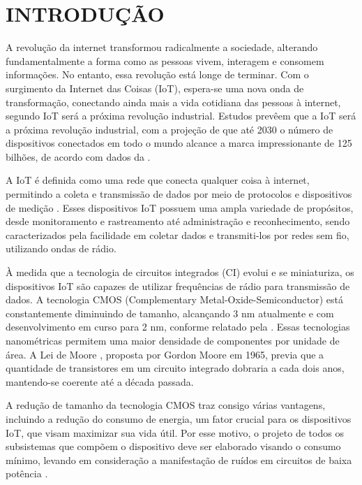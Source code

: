 \chapter{INTRODUÇÃO}\label{cap:introducao}

A revolução da internet transformou radicalmente a sociedade, alterando fundamentalmente a forma como as pessoas vivem, interagem e consomem informações. No entanto, essa revolução está longe de terminar. Com o surgimento da Internet das Coisas (IoT), espera-se uma nova onda de transformação, conectando ainda mais a vida cotidiana das pessoas à internet, segundo \cite{al2020internet} IoT será a próxima revolução industrial. Estudos prevêem que a IoT será a próxima revolução industrial, com a projeção de que até 2030 o número de dispositivos conectados em todo o mundo alcance a marca impressionante de 125 bilhões, de acordo com dados da \cite{cisco}.

A IoT é definida como uma rede que conecta qualquer coisa à internet, permitindo a coleta e transmissão de dados por meio de protocolos e dispositivos de medição \cite{patel2016internet}. Esses dispositivos IoT possuem uma ampla variedade de propósitos, desde monitoramento e rastreamento até administração e reconhecimento, sendo caracterizados pela facilidade em coletar dados e transmiti-los por redes sem fio, utilizando ondas de rádio.

À medida que a tecnologia de circuitos integrados (CI) evolui e se miniaturiza, os dispositivos IoT são capazes de utilizar frequências de rádio para transmissão de dados. A tecnologia CMOS (Complementary Metal-Oxide-Semiconductor) está constantemente diminuindo de tamanho, alcançando 3 nm atualmente e com desenvolvimento em curso para 2 nm, conforme relatado pela \cite{tsmc}. Essas tecnologias nanométricas permitem uma maior densidade de componentes por unidade de área. A Lei de Moore \cite{moore1965moore}, proposta por Gordon Moore em 1965, previa que a quantidade de transistores em um circuito integrado dobraria a cada dois anos, mantendo-se coerente até a década passada.

A redução de tamanho da tecnologia CMOS traz consigo várias vantagens, incluindo a redução do consumo de energia, um fator crucial para os dispositivos IoT, que visam maximizar sua vida útil. Por esse motivo, o projeto de todos os subsistemas que compõem o dispositivo deve ser elaborado visando o consumo mínimo, levando em consideração a manifestação de ruídos em circuitos de baixa potência \cite{fiorelli2012all}.

